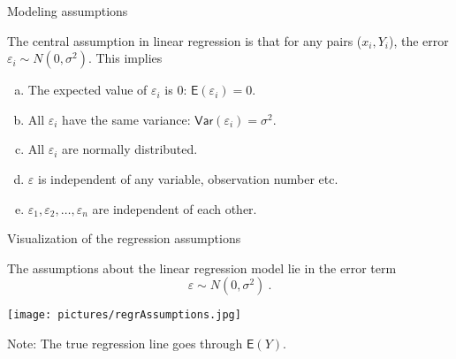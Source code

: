 \documentclass[10pt,ignorenonframetext,]{beamer}
\begin{document}
\begin{frame}

\begin{block}{Modeling assumptions}

\vspace{4mm}

The central assumption in linear regression is that for any pairs
(\(x_i,Y_i\)), the error \(\varepsilon_i \sim N(0,\sigma^2)\). This
implies \vspace{2mm}

\begin{enumerate}
[a)]
\item
  The expected value of \(\varepsilon_i\) is 0:
  \(\mathsf{E}(\varepsilon_i)=0\).
\item
  All \(\varepsilon_i\) have the same variance:
  \(\mathsf{Var}(\varepsilon_i)=\sigma^2\).
\item
  All \(\varepsilon_i\) are normally distributed.
\item
  \(\varepsilon\) is independent of any variable, observation number
  etc.
\item
  \(\varepsilon_1, \varepsilon_2, \ldots, \varepsilon_n\) are
  independent of each other.
\end{enumerate}

\end{block}

\end{frame}

\begin{frame}

\begin{block}{Visualization of the regression assumptions}

The assumptions about the linear regression model lie in the error term
\[\varepsilon \sim N(0,\sigma^2) \ . \]

\vspace{-2mm}

\texttt{[image: pictures/regrAssumptions.jpg]}

Note: The true regression line goes through \(\mathsf{E}(Y)\).

\end{block}

\end{frame}
\end{document}
